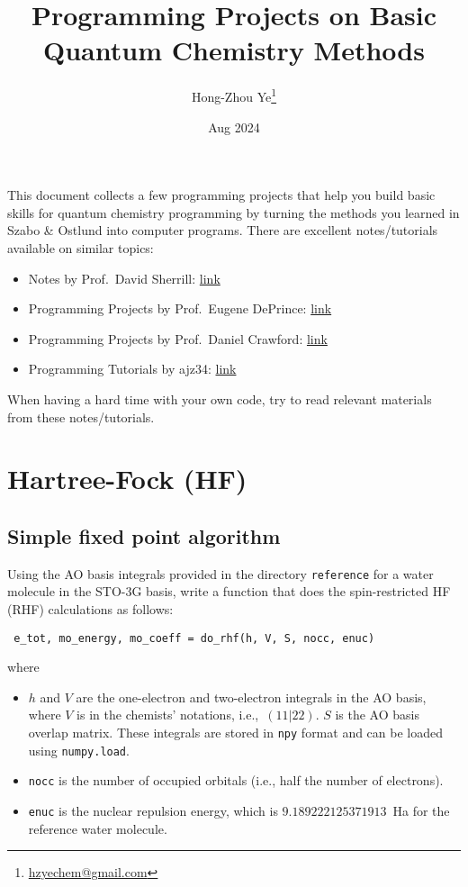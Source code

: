 \documentclass[parskip=full]{article}
\title{Programming Projects on Basic Quantum Chemistry Methods}
\author[1]{Hong-Zhou Ye\thanks{\href{mailto:hzyechem@gmail.com}{hzyechem@gmail.com}}}
\affil[1]{\normalsize\textit{Department of Chemistry and Biochemistry and Institute for Physical Science and Technology \protect\\ University of Maryland, College Park, MD, 20742}}
\date{Aug 2024}
\begin{document}
\maketitle


    This document collects a few programming projects that help you build basic skills for quantum chemistry programming by turning the methods you learned in Szabo \& Ostlund into computer programs.
    There are excellent notes/tutorials available on similar topics:
    \begin{itemize}
        \item Notes by Prof.~David Sherrill: \href{http://vergil.chemistry.gatech.edu/notes/index.html}{link}
        \item Programming Projects by Prof.~Eugene DePrince: \href{https://www.chem.fsu.edu/~deprince/programming_projects}{link}
        \item Programming Projects by Prof.~Daniel Crawford: \href{https://github.com/CrawfordGroup/ProgrammingProjects}{link}
        \item Programming Tutorials by ajz34: \href{https://pycrawfordprogproj.readthedocs.io/en/latest}{link}
    \end{itemize}
    When having a hard time with your own code, try to read relevant materials from these notes/tutorials.


    \section{Hartree-Fock (HF)}

    \subsection{Simple fixed point algorithm}

    Using the AO basis integrals provided in the directory \texttt{reference} for a water molecule in the STO-3G basis, write a function that does the spin-restricted HF (RHF) calculations as follows:
    \begin{verbatim} e_tot, mo_energy, mo_coeff = do_rhf(h, V, S, nocc, enuc)\end{verbatim}
    where
    \begin{itemize}
        \item $h$ and $V$ are the one-electron and two-electron integrals in the AO basis, where $V$ is in the chemists' notations, i.e.,~$(11|22)$.
        $S$ is the AO basis overlap matrix.
        These integrals are stored in \texttt{npy} format and can be loaded using \texttt{numpy.load}.
        \item \texttt{nocc} is the number of occupied orbitals (i.e., half the number of electrons).
        \item \texttt{enuc} is the nuclear repulsion energy, which is  $9.189222125371913$~Ha for the reference water molecule.
    \end{itemize}
\end{document}
